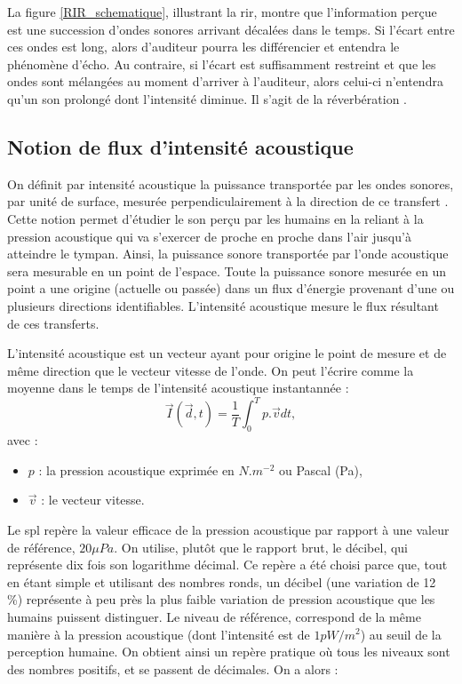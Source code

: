 La figure \ref{RIR_schematique}, illustrant la \gls{rir}, montre que l'information perçue est une succession d'ondes sonores arrivant décalées dans le temps. Si l'écart entre ces ondes est long, alors d'auditeur pourra les différencier et entendra le phénomène d'écho. Au contraire, si l'écart est suffisamment restreint et que les ondes sont mélangées au moment d'arriver à l'auditeur, alors celui-ci n'entendra qu'un son prolongé dont l'intensité diminue. Il s'agit de la réverbération \cite[p. 39]{sabine}. 





\subsection{Notion de flux d'intensité acoustique} \label{sect_intensite}
On définit par intensité acoustique la puissance transportée par les ondes sonores, par unité de surface, mesurée perpendiculairement à la direction de ce transfert \cite[IEC 60050]{cei}. Cette notion permet d'étudier le son perçu par les humains en la reliant à la pression acoustique qui va s'exercer de proche en proche dans l'air jusqu'à atteindre le tympan. Ainsi, la puissance sonore transportée par l'onde acoustique sera mesurable en un point de l'espace. Toute la puissance sonore mesurée en un point a une origine (actuelle ou passée) dans un flux d'énergie provenant d'une ou plusieurs directions identifiables. L'intensité acoustique mesure le flux résultant de ces transferts. 

L'intensité acoustique est un vecteur ayant pour origine le point de mesure et de même direction que le vecteur vitesse de l'onde. On peut l'écrire comme la moyenne dans le temps de l'intensité acoustique instantannée :
\begin{equation} 
\overrightarrow{I}(\overrightarrow{d},t) = \frac{1}{T} \int^T_0 p.\overrightarrow{v}dt,
\end{equation}
avec : 
\begin{itemize}
\item $p$ : la pression acoustique exprimée en $N.m^{-2}$ ou Pascal (Pa),
\item $\overrightarrow{v}$  : le vecteur vitesse.
\end{itemize}

Le \gls{spl} repère la valeur efficace de la pression acoustique par rapport à une valeur de référence, $20 \mu Pa$. On utilise, plutôt que le rapport brut, le décibel, qui représente dix fois son logarithme décimal. Ce repère a été choisi parce que, tout en étant simple et utilisant des nombres ronds, un décibel (une variation de 12 \%) représente à peu près la plus faible variation de pression acoustique que les humains puissent distinguer. Le niveau de référence, correspond de la même manière à la pression acoustique (dont l'intensité est de $1 pW/m^2$) au seuil de la perception humaine. On obtient ainsi un repère pratique où tous les niveaux sont des nombres positifs, et se passent de décimales. On a alors :

